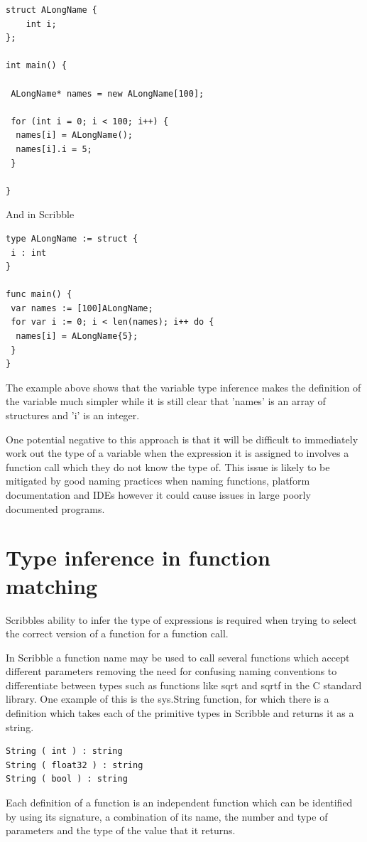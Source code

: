 \documentclass[]{final_report}
\begin{document}
\begin{verbatim}
struct ALongName {
	int i;
};

int main() {

 ALongName* names = new ALongName[100];
 
 for (int i = 0; i < 100; i++) {
  names[i] = ALongName();
  names[i].i = 5;
 }

}
\end{verbatim}
And in Scribble
\begin{verbatim}
type ALongName := struct {
 i : int
}

func main() {
 var names := [100]ALongName;
 for var i := 0; i < len(names); i++ do {
  names[i] = ALongName{5};
 }
}
\end{verbatim}

The example above shows that the variable type inference makes the definition of the variable much simpler while it is still clear that 'names' is an array of structures and 'i' is an integer.

One potential negative to this approach is that it will be difficult to immediately work out the type of a variable when the expression it is assigned to involves a function call which they do not know the type of. This issue is likely to be mitigated by good naming practices when naming functions, platform documentation and IDEs however it could cause issues in large poorly documented programs.

\section{Type inference in function matching}

Scribbles ability to infer the type of expressions is required when trying to select the correct version of a function for a function call. 

In Scribble a function name may be used to call several functions which accept different parameters removing the need for confusing naming conventions to differentiate between types such as functions like sqrt and sqrtf in the C standard library. One example of this is the sys.String function, for which there is a definition which takes each of the primitive types in Scribble and returns it as a string.

\begin{verbatim}
String ( int ) : string
String ( float32 ) : string
String ( bool ) : string
\end{verbatim}

Each definition of a function is an independent function which can be identified by using its signature, a combination of its name, the number and type of parameters and the type of the value that it returns.
\end{document}
